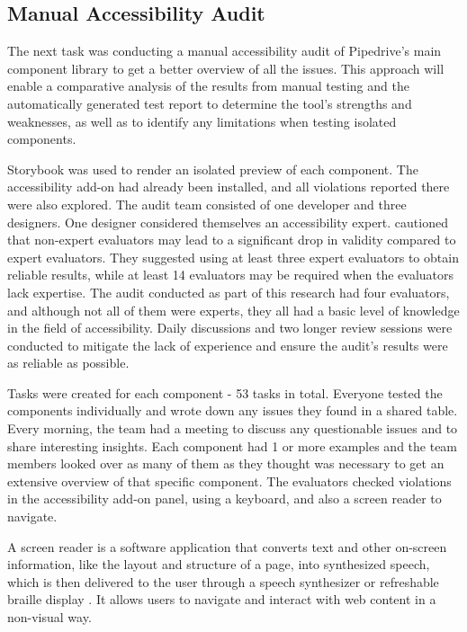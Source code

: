 \documentclass{master_thesis}
\begin{document}
\subsection{Manual Accessibility Audit}

The next task was conducting a manual accessibility audit of Pipedrive's main component library to get a better overview of all the issues. This approach will enable a comparative analysis of the results from manual testing and the automatically generated test report to determine the tool's strengths and weaknesses, as well as to identify any limitations when testing isolated components.

Storybook was used to render an isolated preview of each component. The accessibility add-on had already been installed, and all violations reported there were also explored. The audit team consisted of one developer and three designers. One designer considered themselves an accessibility expert. \citeauthor{Brajnik2011} cautioned that non-expert evaluators may lead to a significant drop in validity compared to expert evaluators. They suggested using at least three expert evaluators to obtain reliable results, while at least 14 evaluators may be required when the evaluators lack expertise. The audit conducted as part of this research had four evaluators, and although not all of them were experts, they all had a basic level of knowledge in the field of accessibility. Daily discussions and two longer review sessions were conducted to mitigate the lack of experience and ensure the audit's results were as reliable as possible.

Tasks were created for each component - 53 tasks in total. Everyone tested the components individually and wrote down any issues they found in a shared table. Every morning, the team had a meeting to discuss any questionable issues and to share interesting insights. Each component had 1 or more examples and the team members looked over as many of them as they thought was necessary to get an extensive overview of that specific component. The evaluators checked violations in the accessibility add-on panel, using a keyboard, and also a screen reader to navigate.

A screen reader is a software application that converts text and other on-screen information, like the layout and structure of a page, into synthesized speech, which is then delivered to the user through a speech synthesizer or refreshable braille display \citep{Watson}. It allows users to navigate and interact with web content in a non-visual way.
\end{document}
